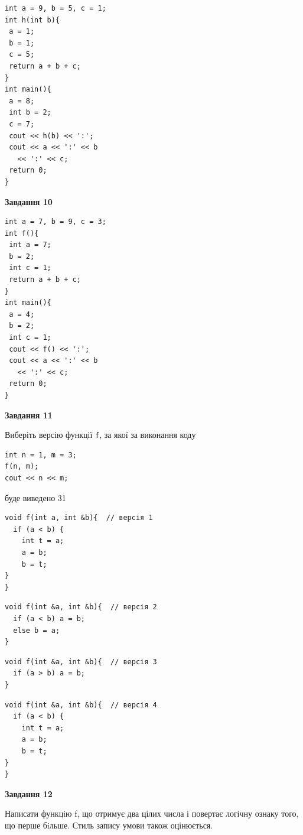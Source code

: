 \documentclass[12pt, ukrainian]{article}
\def\code#1{\Verb!#1!}
\begin{document}
{\begin {large}
\begin{minipage}[t]{7.0cm}
\begin{verbatim}
int a = 9, b = 5, c = 1;
int h(int b){
 a = 1;
 b = 1;
 c = 5;
 return a + b + c;
}
int main(){
 a = 8;
 int b = 2;
 c = 7;
 cout << h(b) << ':';
 cout << a << ':' << b 
   << ':' << c;
 return 0;
}
\end{verbatim}



\begin{center}
\textbf{Завдання 10}
\end{center}
\vspace{-8mm}

\begin{verbatim}
int a = 7, b = 9, c = 3;
int f(){
 int a = 7;
 b = 2;
 int c = 1;
 return a + b + c;
}
int main(){
 a = 4;
 b = 2;
 int c = 1;
 cout << f() << ':';
 cout << a << ':' << b 
   << ':' << c;
 return 0;
}
\end{verbatim}

\end{minipage}
\vline \hspace{1mm}
\begin{minipage}[t]{11.0cm}

\begin{center}
\textbf{Завдання 11}
\end{center}
Виберіть версію функції \code{f}, за якої за виконання коду
\begin{verbatim}
int n = 1, m = 3;
f(n, m);
cout << n << m;
\end{verbatim}

буде виведено 31

\begin{verbatim}
void f(int a, int &b){  // версія 1
  if (a < b) {
    int t = a;
    a = b;
    b = t;
}  
}
\end{verbatim}

\vspace{-8mm}\begin{verbatim}
void f(int &a, int &b){  // версія 2
  if (a < b) a = b;
  else b = a;
}
\end{verbatim}

\vspace{-8mm}\begin{verbatim}
void f(int &a, int &b){  // версія 3
  if (a > b) a = b;
}
\end{verbatim}

\vspace{-8mm}\begin{verbatim}
void f(int &a, int &b){  // версія 4
  if (a < b) {
    int t = a;
    a = b;
    b = t;
}  
}
\end{verbatim}



\begin{center}
\textbf{Завдання 12}
\end{center}

Написати функцiю f, що отримує два цілих числа і повертає логічну ознаку того, що перше бiльше. Стиль запису умови також оцінюється.\par

\end{minipage}

\end {large}}
\end{document}
